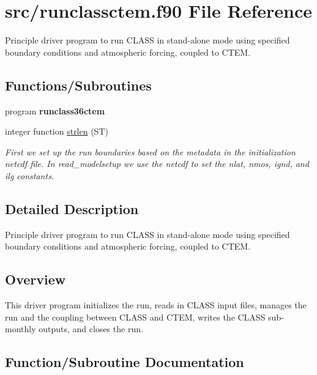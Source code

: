 \hypertarget{runclassctem_8f90}{}\section{src/runclassctem.f90 File Reference}
\label{runclassctem_8f90}


Principle driver program to run C\+L\+A\+S\+S in stand-\/alone mode using specified boundary conditions and atmospheric forcing, coupled to C\+T\+E\+M.  


\subsection*{Functions/\+Subroutines}
\begin{DoxyCompactItemize}
\item 
\hypertarget{runclassctem_8f90_a6d56d6301df42923fa1e8aa2e6c02ec3}{}program {\bfseries runclass36ctem}\label{runclassctem_8f90_a6d56d6301df42923fa1e8aa2e6c02ec3}

\item 
integer function \hyperlink{runclassctem_8f90_ae665ea752226de365786f295628b2f4f}{strlen} (S\+T)
\begin{DoxyCompactList}\small\item\em First we set up the run boundaries based on the metadata in the initialization netcdf file. In read\+\_\+modelsetup we use the netcdf to set the nlat, nmos, ignd, and ilg constants. \end{DoxyCompactList}\end{DoxyCompactItemize}


\subsection{Detailed Description}
Principle driver program to run C\+L\+A\+S\+S in stand-\/alone mode using specified boundary conditions and atmospheric forcing, coupled to C\+T\+E\+M. 

\subsection*{Overview}

This driver program initializes the run, reads in C\+L\+A\+S\+S input files, manages the run and the coupling between C\+L\+A\+S\+S and C\+T\+E\+M, writes the C\+L\+A\+S\+S sub-\/monthly outputs, and closes the run. 

\subsection{Function/\+Subroutine Documentation}
\hypertarget{runclassctem_8f90_ae665ea752226de365786f295628b2f4f}{}
